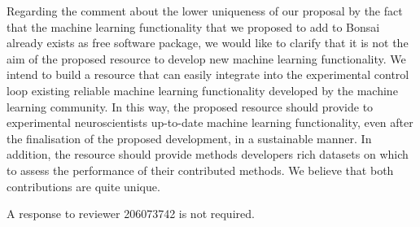 \documentclass[11pt]{letter}
\begin{document}
\begin{letter}{
}
Regarding the comment about the lower uniqueness of our proposal by the fact
that the machine learning functionality that we proposed to add to Bonsai
already exists as free software package, we would like to clarify that it is
not the aim of the proposed resource to develop new machine learning
functionality. We intend to build a resource that can easily integrate into the
experimental control loop existing reliable machine learning functionality
developed by the machine learning community. In this way, the proposed resource
should provide to experimental neuroscientists up-to-date machine learning
functionality, even after the finalisation of the proposed development, in a
sustainable manner. In addition, the resource should provide methods developers
rich datasets on which to assess the performance of their contributed methods.
We believe that both contributions are quite unique.

\pagebreak

A response to reviewer 206073742 is not required. 

\end{letter}
\end{document}
